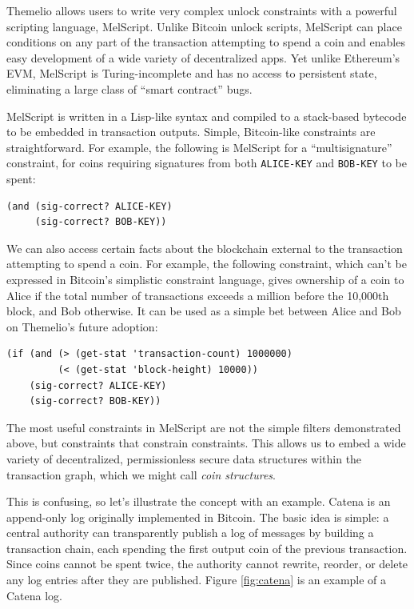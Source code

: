\documentclass[headinclude,12pt]{scrbook}
\begin{document}
Themelio allows users to write very complex unlock constraints with a powerful scripting language, MelScript. Unlike Bitcoin unlock scripts, MelScript can place conditions on any part of the transaction attempting to spend a coin and enables easy development of a wide variety of decentralized apps. Yet unlike Ethereum's EVM, MelScript is Turing-incomplete and has no access to persistent state, eliminating a large class of ``smart contract'' bugs.

MelScript is written in a Lisp-like syntax and compiled to a stack-based bytecode to be embedded in transaction outputs. Simple, Bitcoin-like constraints are straightforward. For example, the following is MelScript for a ``multisignature'' constraint, for coins requiring signatures from both \texttt{ALICE-KEY} and \texttt{BOB-KEY} to be spent:
\begin{lstlisting}
(and (sig-correct? ALICE-KEY)
     (sig-correct? BOB-KEY))
\end{lstlisting}

We can also access certain facts about the blockchain external to the transaction attempting to spend a coin. For example, the following constraint, which can't be expressed in Bitcoin's simplistic constraint language, gives ownership of a coin to Alice if the total number of transactions exceeds a million before the 10,000th block, and Bob otherwise. It can be used as a simple bet between Alice and Bob on Themelio's future adoption:
\begin{lstlisting}
(if (and (> (get-stat 'transaction-count) 1000000)
         (< (get-stat 'block-height) 10000))
    (sig-correct? ALICE-KEY)
    (sig-correct? BOB-KEY))
\end{lstlisting}

The most useful constraints in MelScript are not the simple filters demonstrated above, but constraints that constrain constraints. This allows us to embed a wide variety of decentralized, permissionless secure data structures within the transaction graph, which we might call \emph{coin structures}.

This is confusing, so let's illustrate the concept with an example. Catena \cite{tomescu2017catena} is an append-only log originally implemented in Bitcoin. The basic idea is simple: a central authority can transparently publish a log of messages by building a transaction chain, each spending the first output coin of the previous transaction. Since coins cannot be spent twice, the authority cannot rewrite, reorder, or delete any log entries after they are published. Figure \ref{fig:catena} is an example of a Catena log.
\end{document}
